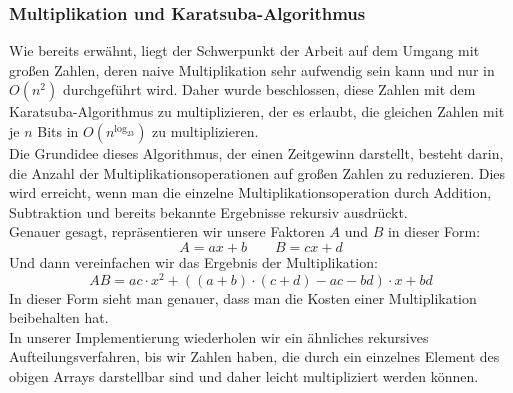 \documentclass[course=erap]{aspdoc}
\begin{document}
\subsubsection{Multiplikation und Karatsuba-Algorithmus}%
Wie bereits erwähnt, liegt der Schwerpunkt der Arbeit auf dem Umgang mit großen Zahlen, deren naive Multiplikation sehr aufwendig sein kann und nur in $O(n^2)$ durchgeführt wird. Daher wurde beschlossen, diese Zahlen mit dem Karatsuba-Algorithmus   \cite{Karatsuba} zu multiplizieren, der es erlaubt, die gleichen Zahlen mit  je $n$ Bits in $O(n^{\log_23})$ zu multiplizieren. \\
Die Grundidee dieses Algorithmus, der einen Zeitgewinn darstellt, besteht darin, die Anzahl der Multiplikationsoperationen auf großen Zahlen zu reduzieren. Dies wird erreicht, wenn man die einzelne Multiplikationsoperation durch Addition, Subtraktion und bereits bekannte Ergebnisse rekursiv ausdrückt. \\
Genauer gesagt, repräsentieren wir unsere Faktoren $A$ und $B$ in dieser Form:
\begin{equation*}
A = ax + b \qquad B = cx + d 
\end{equation*} 
Und dann vereinfachen wir das Ergebnis der Multiplikation:
\begin{equation}\label{eq:karatsuba}
AB = ac\cdot x^2 + ((a + b)\cdot(c + d) - ac - bd)\cdot x + bd
\end{equation}
In dieser Form sieht man genauer, dass man die Kosten einer Multiplikation beibehalten hat.\\
In unserer Implementierung wiederholen wir ein ähnliches rekursives Aufteilungsverfahren, bis wir Zahlen haben, die durch ein einzelnes Element des obigen Arrays darstellbar sind und daher leicht multipliziert werden können.
\end{document}
